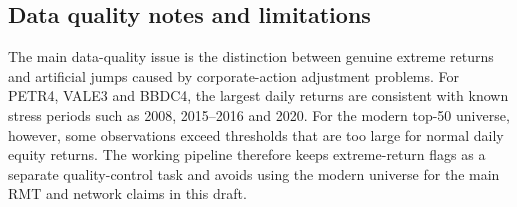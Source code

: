 \subsection{Data quality notes and limitations}

The main data-quality issue is the distinction between genuine extreme returns and artificial jumps caused by corporate-action adjustment problems. For PETR4, VALE3 and BBDC4, the largest daily returns are consistent with known stress periods such as 2008, 2015--2016 and 2020. For the modern top-50 universe, however, some observations exceed thresholds that are too large for normal daily equity returns. The working pipeline therefore keeps extreme-return flags as a separate quality-control task and avoids using the modern universe for the main RMT and network claims in this draft.
